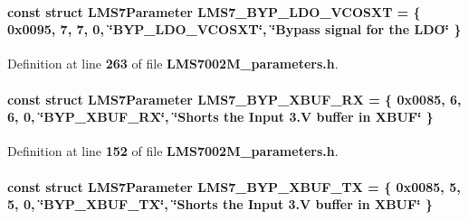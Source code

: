 \paragraph[{L\+M\+S7\+\_\+\+B\+Y\+P\+\_\+\+L\+D\+O\+\_\+\+V\+C\+O\+S\+XT}]{\setlength{\rightskip}{0pt plus 5cm}const struct {\bf L\+M\+S7\+Parameter} L\+M\+S7\+\_\+\+B\+Y\+P\+\_\+\+L\+D\+O\+\_\+\+V\+C\+O\+S\+XT = \{ 0x0095, 7, 7, 0, \char`\"{}\+B\+Y\+P\+\_\+\+L\+D\+O\+\_\+\+V\+C\+O\+S\+X\+T\char`\"{}, \char`\"{}\+Bypass signal for the L\+D\+O\char`\"{} \}\hspace{0.3cm}{\ttfamily [static]}}\label{LMS7002M__parameters_8h_a46b2cd85373eb76188c0deba1b0c12d3}


Definition at line {\bf 263} of file {\bf L\+M\+S7002\+M\+\_\+parameters.\+h}.

\paragraph[{L\+M\+S7\+\_\+\+B\+Y\+P\+\_\+\+X\+B\+U\+F\+\_\+\+RX}]{\setlength{\rightskip}{0pt plus 5cm}const struct {\bf L\+M\+S7\+Parameter} L\+M\+S7\+\_\+\+B\+Y\+P\+\_\+\+X\+B\+U\+F\+\_\+\+RX = \{ 0x0085, 6, 6, 0, \char`\"{}\+B\+Y\+P\+\_\+\+X\+B\+U\+F\+\_\+\+R\+X\char`\"{}, \char`\"{}\+Shorts the Input 3.\+V buffer in X\+B\+U\+F\char`\"{} \}\hspace{0.3cm}{\ttfamily [static]}}\label{LMS7002M__parameters_8h_acc2fe4ea13ac2efc8ded566e620e2302}


Definition at line {\bf 152} of file {\bf L\+M\+S7002\+M\+\_\+parameters.\+h}.

\paragraph[{L\+M\+S7\+\_\+\+B\+Y\+P\+\_\+\+X\+B\+U\+F\+\_\+\+TX}]{\setlength{\rightskip}{0pt plus 5cm}const struct {\bf L\+M\+S7\+Parameter} L\+M\+S7\+\_\+\+B\+Y\+P\+\_\+\+X\+B\+U\+F\+\_\+\+TX = \{ 0x0085, 5, 5, 0, \char`\"{}\+B\+Y\+P\+\_\+\+X\+B\+U\+F\+\_\+\+T\+X\char`\"{}, \char`\"{}\+Shorts the Input 3.\+V buffer in X\+B\+U\+F\char`\"{} \}\hspace{0.3cm}{\ttfamily [static]}}\label{LMS7002M__parameters_8h_afa26e2e3e09a1acafc58d4fc62816bfe}


